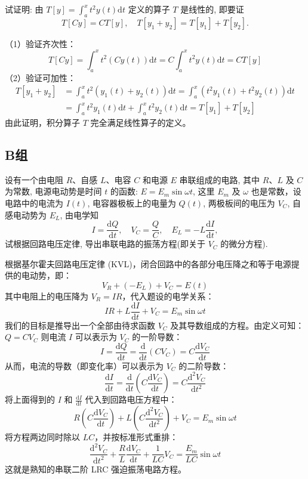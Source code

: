 \documentclass[lang=cn,11pt]{elegantbook}
\begin{document}
\begin{exercise}[积分算子的线性性证明]
试证明: 由 $T[y]=\int_a^x t^2 y(t)\mathrm{d}t$ 定义的算子 $T$ 是线性的, 即要证
\[
T[Cy] = CT[y],\quad T[y_1+y_2] = T[y_1]+T[y_2].
\]
\end{exercise}
\begin{solution}
（1）验证齐次性：
\[
T[Cy] = \int_a^x t^2 (C y(t)) \mathrm{d}t = C \int_a^x t^2 y(t) \mathrm{d}t = C T[y]
\]
（2）验证可加性：
\begin{align*}
T[y_1+y_2] &= \int_a^x t^2 (y_1(t) + y_2(t)) \mathrm{d}t = \int_a^x \left(t^2 y_1(t) + t^2 y_2(t)\right) \mathrm{d}t \\
&= \int_a^x t^2 y_1(t) \mathrm{d}t + \int_a^x t^2 y_2(t) \mathrm{d}t = T[y_1] + T[y_2]
\end{align*}
由此证明，积分算子 $T$ 完全满足线性算子的定义。
\end{solution}

\subsection{B组}

\begin{exercise}
设有一个由电阻 $R$、自感 $L$、电容 $C$ 和电源 $E$ 串联组成的电路, 其中 $R$、$L$ 及 $C$ 为常数, 电源电动势是时间 $t$ 的函数: $E=E_m\sin\omega t$, 这里 $E_m$ 及 $\omega$ 也是常数，设电路中的电流为 $I(t)$, 电容器极板上的电量为 $Q(t)$, 两极板间的电压为 $V_C$, 自感电动势为 $E_L$, 由电学知
\[
I = \frac{\mathrm{d}Q}{\mathrm{d}t},\quad V_C = \frac{Q}{C},\quad E_L = -L\frac{\mathrm{d}I}{\mathrm{d}t},
\]
试根据回路电压定律, 导出串联电路的振荡方程(即关于 $V_C$ 的微分方程).
\end{exercise}
\begin{solution}
根据基尔霍夫回路电压定律 (KVL)，闭合回路中的各部分电压降之和等于电源提供的电动势，即：
\[
V_R + (-E_L) + V_C = E(t)
\]
其中电阻上的电压降为 $V_R = I R$，代入题设的电学关系：
\[
I R + L\frac{\mathrm{d}I}{\mathrm{d}t} + V_C = E_m\sin\omega t
\]
我们的目标是推导出一个全部由待求函数 $V_C$ 及其导数组成的方程。由定义可知：
$Q = C V_C$
则电流 $I$ 可以表示为 $V_C$ 的一阶导数：
\[
I = \frac{\mathrm{d}Q}{\mathrm{d}t} = \frac{\mathrm{d}}{\mathrm{d}t}(C V_C) = C\frac{\mathrm{d}V_C}{\mathrm{d}t}
\]
从而，电流的导数（即变化率）可以表示为 $V_C$ 的二阶导数：
\[
\frac{\mathrm{d}I}{\mathrm{d}t} = \frac{\mathrm{d}}{\mathrm{d}t}\left(C\frac{\mathrm{d}V_C}{\mathrm{d}t}\right) = C\frac{\mathrm{d}^2V_C}{\mathrm{d}t^2}
\]
将上面得到的 $I$ 和 $\frac{\mathrm{d}I}{\mathrm{d}t}$ 代入到回路电压方程中：
\[
R\left(C\frac{\mathrm{d}V_C}{\mathrm{d}t}\right) + L\left(C\frac{\mathrm{d}^2V_C}{\mathrm{d}t^2}\right) + V_C = E_m\sin\omega t
\]
将方程两边同时除以 $LC$，并按标准形式重排：
\[
\boxed{\frac{\mathrm{d}^2V_C}{\mathrm{d}t^2} + \frac{R}{L}\frac{\mathrm{d}V_C}{\mathrm{d}t} + \frac{1}{LC}V_C = \frac{E_m}{LC}\sin\omega t}
\]
这就是熟知的串联二阶 LRC 强迫振荡电路方程。
\end{solution}
\end{document}
